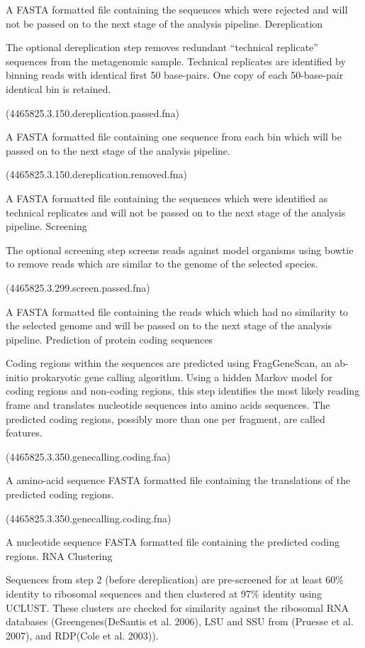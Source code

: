 \documentclass[letterpaper,10pt,english]{sphinxmanual}
\begin{document}
A FASTA formatted file containing the sequences which were rejected and
will not be passed on to the next stage of the analysis pipeline.
Dereplication

The optional dereplication step removes redundant “technical replicate”
sequences from the metagenomic sample. Technical replicates are
identified by binning reads with identical first 50 base-pairs. One copy
of each 50-base-pair identical bin is retained.

 (4465825.3.150.dereplication.passed.fna)

A FASTA formatted file containing one sequence from each bin which will
be passed on to the next stage of the analysis pipeline.

 (4465825.3.150.dereplication.removed.fna)

A FASTA formatted file containing the sequences which were identified as
technical replicates and will not be passed on to the next stage of the
analysis pipeline. Screening

The optional screening step screens reads against model organisms using
bowtie to remove reads which are similar to the genome of the selected
species.

 (4465825.3.299.screen.passed.fna)

A FASTA formatted file containing the reads which which had no
similarity to the selected genome and will be passed on to the next
stage of the analysis pipeline. Prediction of protein coding sequences

Coding regions within the sequences are predicted using FragGeneScan, an
ab-initio prokaryotic gene calling algorithm. Using a hidden Markov
model for coding regions and non-coding regions, this step identifies
the most likely reading frame and translates nucleotide sequences into
amino acids sequences. The predicted coding regions, possibly more than
one per fragment, are called features.

 (4465825.3.350.genecalling.coding.faa)

A amino-acid sequence FASTA formatted file containing the translations
of the predicted coding regions.

 (4465825.3.350.genecalling.coding.fna)

A nucleotide sequence FASTA formatted file containing the predicted
coding regions. RNA Clustering

Sequences from step 2 (before dereplication) are pre-screened for at
least 60\% identity to ribosomal sequences and then clustered at 97\%
identity using UCLUST. These clusters are checked for similarity against
the ribosomal RNA databases (Greengenes(DeSantis et al. 2006), LSU and
SSU from (Pruesse et al. 2007), and RDP(Cole et al. 2003)).
\end{document}

